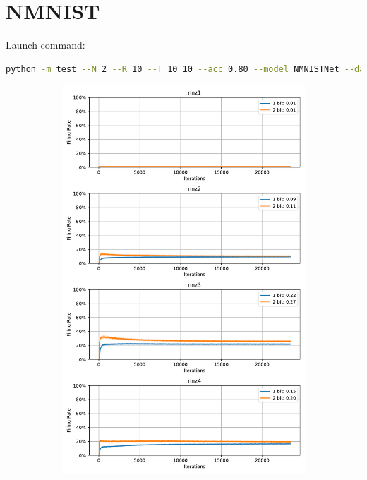     \section{NMNIST}
    \label{appendix:firerate_nmnist}
        Launch command: 
        \begin{lstlisting}[language=Bash, basicstyle=\small, breaklines=true]
python -m test --N 2 --R 10 --T 10 10 --acc 0.80 --model NMNISTNet --data-path /scratch/zyi/codeSpace/data --dataset NMNIST --batch-size 128 --opt adam --lr 2e-3 --lr-scheduler none --epochs 50 --lr-warmup-epochs 0 --output-dir /scratch/zyi/codeSpace/MultibitSpikes/firerate --mixup-alpha 0.0 --cutmix-alpha 0.0 --label-smoothing 0.0 --disable-amp
        \end{lstlisting}

        \begin{figure}[H]
            \centering
            \begin{subfigure}[H]{0.48\textwidth}
                \centering
                \includegraphics[width=\textwidth]{../firerate/NMNIST/plots/nmnist_train_firerate.pdf}

\end{subfigure}
\end{figure}
